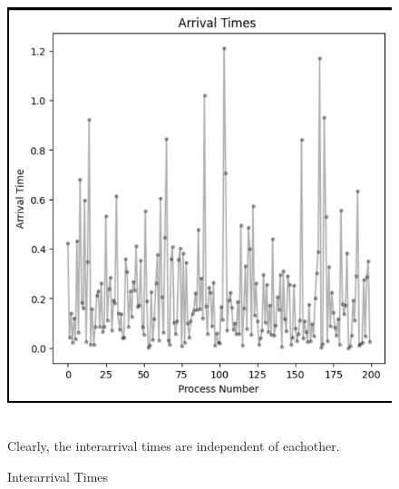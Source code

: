 \documentclass{beamer}
\begin{document}
\begin{frame}
\begin{figure}
    \centering
    \includegraphics[width=0.75\linewidth]{images/interarrival2.png}
    \caption{Interarrival Times}
    \label{InterArrival Times of the Processes}
    \\
Clearly, the interarrival times are independent of eachother.\\
\end{figure}
\end{frame}
\end{document}
